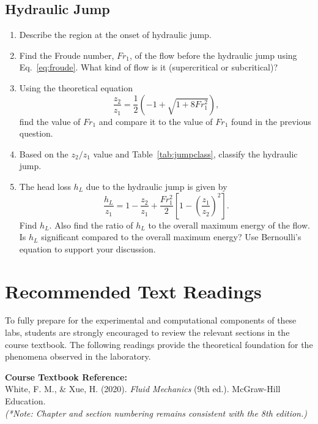 \documentclass[12pt,letterpaper]{article}
\begin{document}
\subsection{Hydraulic Jump}
\begin{enumerate}[leftmargin=*]
    \item Describe the region at the onset of hydraulic jump.
    \item Find the Froude number, \(Fr_1\), of the flow before the hydraulic jump using Eq.~\eqref{eq:froude}. What kind of flow is it (supercritical or subcritical)?
    \item Using the theoretical equation
    \[
    \frac{z_2}{z_1}
    =
    \frac{1}{2}\left(-1+\sqrt{1+8Fr_1^2}\right),
    \]
    find the value of \(Fr_1\) and compare it to the value of \(Fr_1\) found in the previous question.
    \item Based on the \(z_2/z_1\) value and Table~\ref{tab:jumpclass}, classify the hydraulic jump.
    \item The head loss \(h_L\) due to the hydraulic jump is given by
    \[
    \frac{h_L}{z_1}
    =
    1-\frac{z_2}{z_1}
    +
    \frac{Fr_1^2}{2}
    \left[
    1-\left(\frac{z_1}{z_2}\right)^2
    \right].
    \]
    Find \(h_L\). Also find the ratio of \(h_L\) to the overall maximum energy of the flow. Is \(h_L\) significant compared to the overall maximum energy? Use Bernoulli’s equation to support your discussion.
\end{enumerate}

\section{Recommended Text Readings}

To fully prepare for the experimental and computational components of these labs, students are strongly encouraged to review the relevant sections in the course textbook. The following readings provide the theoretical foundation for the phenomena observed in the laboratory.

\vspace{0.3cm}
\noindent\textbf{Course Textbook Reference:} \\
White, F. M., \& Xue, H. (2020). \textit{Fluid Mechanics} (9th ed.). McGraw-Hill Education. \\
\textit{(*Note: Chapter and section numbering remains consistent with the 8th edition.)}
\vspace{0.3cm}
\end{document}
